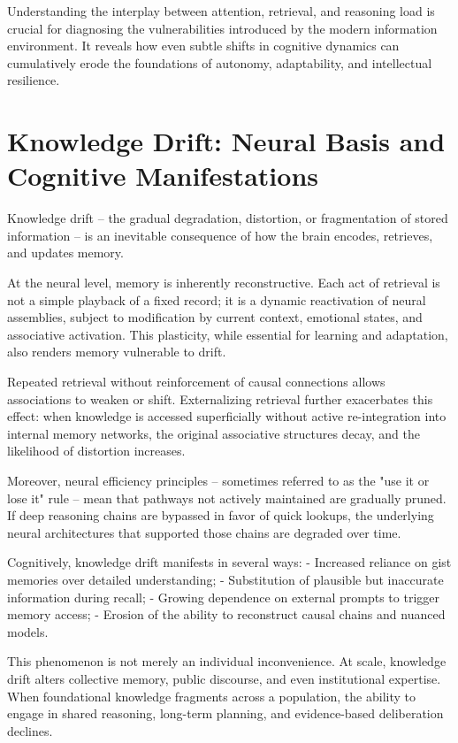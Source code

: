 Understanding the interplay between attention, retrieval, and reasoning
load is crucial for diagnosing the vulnerabilities introduced by the
modern information environment. It reveals how even subtle shifts in
cognitive dynamics can cumulatively erode the foundations of autonomy,
adaptability, and intellectual resilience.


\section{Knowledge Drift: Neural Basis and Cognitive Manifestations}

Knowledge drift -- the gradual degradation, distortion, or fragmentation
of stored information -- is an inevitable consequence of how the brain
encodes, retrieves, and updates memory.

At the neural level, memory is inherently reconstructive. Each act of
retrieval is not a simple playback of a fixed record; it is a dynamic
reactivation of neural assemblies, subject to modification by current
context, emotional states, and associative activation. This plasticity,
while essential for learning and adaptation, also renders memory
vulnerable to drift.

Repeated retrieval without reinforcement of causal connections allows
associations to weaken or shift. Externalizing retrieval further
exacerbates this effect: when knowledge is accessed superficially
without active re-integration into internal memory networks, the
original associative structures decay, and the likelihood of distortion
increases.

Moreover, neural efficiency principles -- sometimes referred to as the
"use it or lose it" rule -- mean that pathways not actively maintained
are gradually pruned. If deep reasoning chains are bypassed in favor of
quick lookups, the underlying neural architectures that supported those
chains are degraded over time.

Cognitively, knowledge drift manifests in several ways: - Increased
reliance on gist memories over detailed understanding; - Substitution of
plausible but inaccurate information during recall; - Growing dependence
on external prompts to trigger memory access; - Erosion of the ability
to reconstruct causal chains and nuanced models.

This phenomenon is not merely an individual inconvenience. At scale,
knowledge drift alters collective memory, public discourse, and even
institutional expertise. When foundational knowledge fragments across a
population, the ability to engage in shared reasoning, long-term
planning, and evidence-based deliberation declines.

